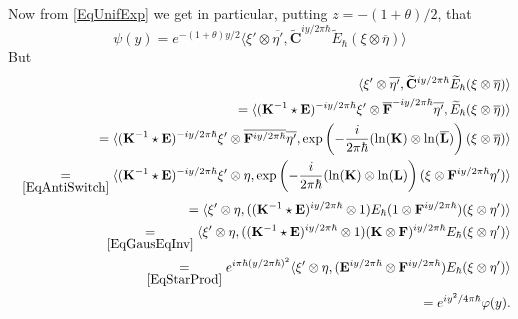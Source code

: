 \documentclass[11pt, reqno]{amsart}
\theoremstyle{definition}
\numberwithin{equation}{section}
\newcommand{\Eb}{\mathbf{E}}
\newcommand{\Fb}{\mathbf{F}}
\newcommand{\Kb}{\mathbf{K}}
\newcommand{\Lb}{\mathbf{L}}
\newcommand{\Cb}{\mathbf{C}}
\begin{document}
Now from \eqref{EqUnifExp} we get in particular, putting $z =- (1+\theta)/2$, that
\[
\psi(y) = e^{-(1+\theta)y/2}\langle \xi'\otimes \overline{\eta'},\widetilde{\Cb}^{iy/2\pi\hbar}\widetilde{E}_{\hbar}(\xi\otimes \overline{\eta})\rangle 
\]
But
\begin{eqnarray*}
&& \hspace{-2cm} \langle \xi'\otimes \overline{\eta'},\widetilde{\Cb}^{iy/2\pi\hbar}\widetilde{E}_{\hbar}(\xi\otimes \overline{\eta})\rangle  \\ &&= \langle (\Kb^{-1}\star\Eb)^{-iy/2\pi\hbar}\xi'\otimes \overline{\Fb}^{-iy/2\pi\hbar} \overline{\eta'}, \widetilde{E}_{\hbar}(\xi\otimes \overline{\eta})\rangle \\
&& =\langle (\Kb^{-1}\star\Eb)^{-iy/2\pi\hbar}\xi'\otimes \overline{\Fb^{iy/2\pi\hbar}} \overline{\eta'},\exp\left(-\frac{i}{2\pi \hbar}(\ln(\Kb)\otimes \ln(\overline{\Lb})\right)(\xi\otimes \overline{\eta})\rangle \\
&&\underset{\eqref{EqAntiSwitch}}{=} \langle (\Kb^{-1}\star\Eb)^{-iy/2\pi\hbar}\xi'\otimes \eta, \exp\left(-\frac{i}{2\pi \hbar}(\ln(\Kb)\otimes \ln(\Lb)\right)(\xi\otimes \Fb^{iy/2\pi\hbar}\eta')\rangle \\
&&= \langle \xi'\otimes \eta, ((\Kb^{-1}\star\Eb)^{iy/2\pi\hbar}\otimes 1) E_{\hbar}(1\otimes \Fb^{iy/2\pi\hbar})(\xi\otimes \eta')\rangle \\
&&\underset{\eqref{EqGausEqInv}}{=} \langle \xi'\otimes \eta, ((\Kb^{-1}\star\Eb)^{iy/2\pi\hbar}\otimes 1)(\Kb\otimes \Fb)^{iy/2\pi\hbar} E_{\hbar}(\xi\otimes \eta')\rangle\\
&&\underset{\eqref{EqStarProd}}{=} e^{i\pi\hbar (y/2\pi\hbar)^2} \langle \xi'\otimes \eta,(\Eb^{iy/2\pi\hbar}\otimes \Fb^{iy/2\pi\hbar})E_{\hbar}(\xi\otimes \eta')\rangle \\
&&= e^{iy^2/4\pi\hbar}\varphi(y). 
\end{eqnarray*}
\end{document}

